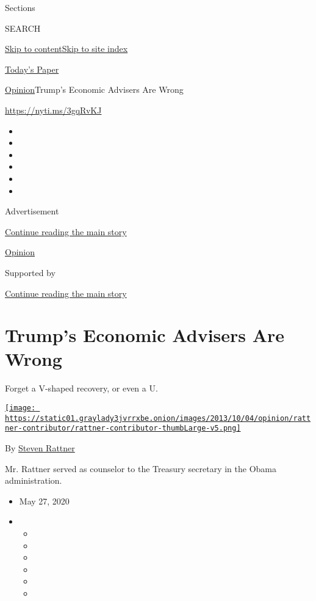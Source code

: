 Sections

SEARCH

\protect\hyperlink{site-content}{Skip to
content}\protect\hyperlink{site-index}{Skip to site index}

\href{https://myaccount.nytimes3xbfgragh.onion/auth/login?response_type=cookie\&client_id=vi}{}

\href{https://www.nytimes3xbfgragh.onion/section/todayspaper}{Today's
Paper}

\href{/section/opinion}{Opinion}\textbar{}Trump's Economic Advisers Are
Wrong

\url{https://nyti.ms/3gqRvKJ}

\begin{itemize}
\item
\item
\item
\item
\item
\item
\end{itemize}

Advertisement

\protect\hyperlink{after-top}{Continue reading the main story}

\href{/section/opinion}{Opinion}

Supported by

\protect\hyperlink{after-sponsor}{Continue reading the main story}

\hypertarget{trumps-economic-advisers-are-wrong}{%
\section{Trump's Economic Advisers Are
Wrong}\label{trumps-economic-advisers-are-wrong}}

Forget a V-shaped recovery, or even a U.

\href{https://www.nytimes3xbfgragh.onion/topic/person/steven-rattner}{\texttt{[image: https://static01.graylady3jvrrxbe.onion/images/2013/10/04/opinion/rattner-contributor/rattner-contributor-thumbLarge-v5.png]}}

By
\href{https://www.nytimes3xbfgragh.onion/topic/person/steven-rattner}{Steven
Rattner}

Mr. Rattner served as counselor to the Treasury secretary in the Obama
administration.

\begin{itemize}
\item
  May 27, 2020
\item
  \begin{itemize}
  \item
  \item
  \item
  \item
  \item
  \item
  \end{itemize}
\end{itemize}

